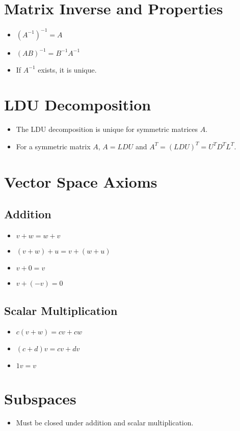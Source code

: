 \documentclass{article}
\begin{document}
\section*{Matrix Inverse and Properties}
\begin{itemize}
    \item $(A^{-1})^{-1} = A$
    \item $(AB)^{-1} = B^{-1}A^{-1}$
    \item If $A^{-1}$ exists, it is unique.
\end{itemize}

\section*{LDU Decomposition}
\begin{itemize}
    \item The LDU decomposition is unique for symmetric matrices $A$.
    \item For a symmetric matrix $A$, $A = LDU$ and $A^T = (LDU)^T = U^T D^T L^T$.
\end{itemize}

\section*{Vector Space Axioms}
\subsection*{Addition}
\begin{itemize}
    \item $v + w = w + v$
    \item $(v + w) + u = v + (w + u)$
    \item $v + 0 = v$
    \item $v + (-v) = 0$
\end{itemize}

\subsection*{Scalar Multiplication}
\begin{itemize}
    \item $c(v + w) = cv + cw$
    \item $(c + d)v = cv + dv$
    \item $1v = v$
\end{itemize}

\section*{Subspaces}
\begin{itemize}
    \item Must be closed under addition and scalar multiplication.
\end{itemize}
\end{document}
